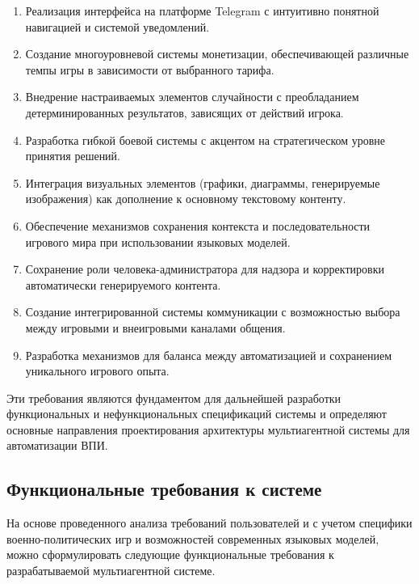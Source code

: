 \begin{enumerate}
    \item Реализация интерфейса на платформе Telegram с интуитивно понятной навигацией и системой уведомлений.

    \item Создание многоуровневой системы монетизации, обеспечивающей различные темпы игры в зависимости от выбранного тарифа.

    \item Внедрение настраиваемых элементов случайности с преобладанием детерминированных результатов, зависящих от действий игрока.

    \item Разработка гибкой боевой системы с акцентом на стратегическом уровне принятия решений.

    \item Интеграция визуальных элементов (графики, диаграммы, генерируемые изображения) как дополнение к основному текстовому контенту.

    \item Обеспечение механизмов сохранения контекста и последовательности игрового мира при использовании языковых моделей.

    \item Сохранение роли человека-администратора для надзора и корректировки автоматически генерируемого контента.

    \item Создание интегрированной системы коммуникации с возможностью выбора между игровыми и внеигровыми каналами общения.

    \item Разработка механизмов для баланса между автоматизацией и сохранением уникального игрового опыта.
\end{enumerate}

Эти требования являются фундаментом для дальнейшей разработки функциональных и нефункциональных спецификаций системы и определяют основные направления проектирования архитектуры мультиагентной системы для автоматизации ВПИ.

\subsection{Функциональные требования к системе}

На основе проведенного анализа требований пользователей и с учетом специфики военно-политических игр и возможностей современных языковых моделей, можно сформулировать следующие функциональные требования к разрабатываемой мультиагентной системе.


